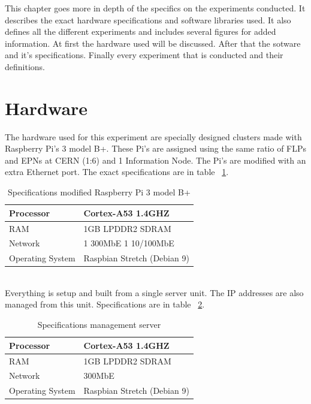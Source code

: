 This chapter goes more in depth of the specifics on the experiments conducted. It describes the exact hardware specifications and software libraries used. It also defines all the different experiments and includes several figures for added information. At first the hardware used will be discussed. After that the sotware and it's specifications. Finally every experiment that is conducted and their definitions.
\section{Hardware}
The hardware used for this experiment are specially designed clusters made with Raspberry Pi's 3 model B+. These Pi's are assigned using the same ratio of FLPs and EPNs at CERN (1:6) and 1 Information Node. The Pi's are modified with an extra Ethernet port. The exact specifications are in table ~\ref{table:RaspberrySpecifications}.

\begin{table}[htb]
\begin{tabular}{| l | l |}
\hline
Processor & Cortex-A53 1.4GHZ\\ \hline
RAM & 1GB LPDDR2 SDRAM\\ \hline
Network & 1 300MbE 1 10/100MbE \\ \hline
Operating System & Raspbian Stretch (Debian 9)\\ \hline
\end{tabular}
\caption{Specifications modified Raspberry Pi 3 model B+}
\label{table:RaspberrySpecifications}
\end{table}

~\\ Everything is setup and built from a single server unit. The IP addresses are also managed from this unit. Specifications are in table ~\ref{table:ManagementSpecifications}.

\begin{table}[htb]
\begin{tabular}{| l | l |}
\hline
Processor & Cortex-A53 1.4GHZ\\ \hline
RAM & 1GB LPDDR2 SDRAM\\ \hline
Network & 300MbE\\ \hline
Operating System & Raspbian Stretch (Debian 9)\\ \hline
\end{tabular}
\caption{Specifications management server}
\label{table:ManagementSpecifications}
\end{table}

